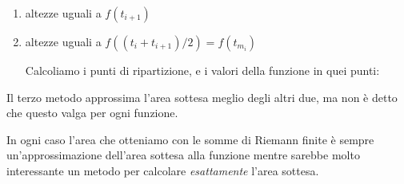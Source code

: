 \begin{esempio}
\begin{enumerate}
\item altezze  uguali a \(f(t_{i+1})\)


\item altezze  uguali a \(f((t_{i}+t_{i+1})/2) = f(t_{m_i})\)

Calcoliamo i punti di ripartizione, e i valori della funzione in quei 
punti:

\end{enumerate}
\end{esempio}

\begin{newoss}{}{}
Il terzo metodo approssima l'area sottesa meglio degli altri due, ma non è 
detto che questo valga per ogni funzione.

In ogni caso l'area che otteniamo con le somme di Riemann finite è sempre 
un'approssimazione dell'area sottesa alla funzione mentre sarebbe molto 
interessante un metodo per calcolare \emph{esattamente} l'area sottesa.
\end{newoss}


